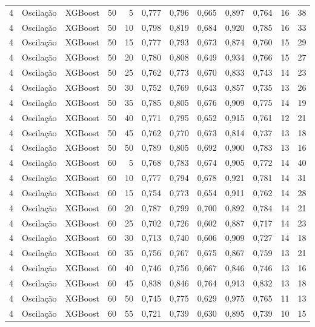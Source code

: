 \begin{longtable}{@{}rllrrrrrrrrr@{}}
4 & Oscilação & XGBoost & 50 & 5 & 0,777 & 0,796 & 0,665 & 0,897 & 0,764 & 16 & 38 \\
4 & Oscilação & XGBoost & 50 & 10 & 0,798 & 0,819 & 0,684 & 0,920 & 0,785 & 16 & 33 \\
4 & Oscilação & XGBoost & 50 & 15 & 0,777 & 0,793 & 0,673 & 0,874 & 0,760 & 15 & 29 \\
4 & Oscilação & XGBoost & 50 & 20 & 0,780 & 0,808 & 0,649 & 0,934 & 0,766 & 15 & 27 \\
4 & Oscilação & XGBoost & 50 & 25 & 0,762 & 0,773 & 0,670 & 0,833 & 0,743 & 14 & 23 \\
4 & Oscilação & XGBoost & 50 & 30 & 0,752 & 0,769 & 0,643 & 0,857 & 0,735 & 13 & 26 \\
4 & Oscilação & XGBoost & 50 & 35 & 0,785 & 0,805 & 0,676 & 0,909 & 0,775 & 14 & 19 \\
4 & Oscilação & XGBoost & 50 & 40 & 0,771 & 0,795 & 0,652 & 0,915 & 0,761 & 12 & 21 \\
4 & Oscilação & XGBoost & 50 & 45 & 0,762 & 0,770 & 0,673 & 0,814 & 0,737 & 13 & 18 \\
4 & Oscilação & XGBoost & 50 & 50 & 0,789 & 0,805 & 0,692 & 0,900 & 0,783 & 13 & 16 \\
4 & Oscilação & XGBoost & 60 & 5 & 0,768 & 0,783 & 0,674 & 0,905 & 0,772 & 14 & 40 \\
4 & Oscilação & XGBoost & 60 & 10 & 0,777 & 0,794 & 0,678 & 0,921 & 0,781 & 14 & 31 \\
4 & Oscilação & XGBoost & 60 & 15 & 0,754 & 0,773 & 0,654 & 0,911 & 0,762 & 14 & 28 \\
4 & Oscilação & XGBoost & 60 & 20 & 0,787 & 0,799 & 0,700 & 0,892 & 0,784 & 14 & 21 \\
4 & Oscilação & XGBoost & 60 & 25 & 0,702 & 0,726 & 0,602 & 0,887 & 0,717 & 14 & 23 \\
4 & Oscilação & XGBoost & 60 & 30 & 0,713 & 0,740 & 0,606 & 0,909 & 0,727 & 14 & 18 \\
4 & Oscilação & XGBoost & 60 & 35 & 0,756 & 0,767 & 0,675 & 0,867 & 0,759 & 13 & 21 \\
4 & Oscilação & XGBoost & 60 & 40 & 0,746 & 0,756 & 0,667 & 0,846 & 0,746 & 13 & 16 \\
4 & Oscilação & XGBoost & 60 & 45 & 0,838 & 0,846 & 0,764 & 0,913 & 0,832 & 13 & 18 \\
4 & Oscilação & XGBoost & 60 & 50 & 0,745 & 0,775 & 0,629 & 0,975 & 0,765 & 11 & 13 \\
4 & Oscilação & XGBoost & 60 & 55 & 0,721 & 0,739 & 0,630 & 0,895 & 0,739 & 10 & 15 \\

\end{longtable}
